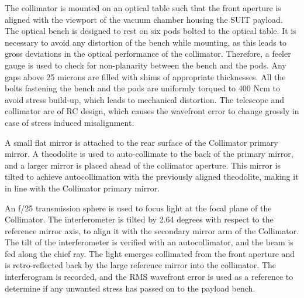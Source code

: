 \documentclass[12pt]{spieman}  %
\begin{document}
The collimator is mounted on an optical table such that the front aperture is aligned with the viewport of the vacuum chamber housing the SUIT payload. The optical bench is designed to rest on six pods bolted to the optical table. It is necessary to avoid any distortion of the bench while mounting, as this leads to gross deviations in the optical performance of the collimator. Therefore, a feeler gauge is used to check for non-planarity between the bench and the pods. Any gaps above 25 microns are filled with shims of appropriate thicknesses. All the bolts fastening the bench and the pods are uniformly torqued to 400 Ncm to avoid stress build-up, which leads to mechanical distortion. The telescope and collimator are of RC design, which causes the wavefront error to change grossly in case of stress induced misalignment.

A small flat mirror is attached to the rear surface of the Collimator primary mirror. A theodolite is used to auto-collimate to the back of the primary mirror, and a larger mirror is placed ahead of the collimator aperture. This mirror is tilted to achieve autocollimation with the previously aligned theodolite, making it in line with the Collimator primary mirror.

An f/25 transmission sphere is used to focus light at the focal plane of the Collimator. The interferometer is tilted by 2.64 degrees with respect to the reference mirror axis, to align it with the secondary mirror arm of the Collimator. The tilt of the interferometer is verified with an autocollimator, and the beam is fed along the chief ray. The light emerges collimated from the front aperture and is retro-reflected back by the large reference mirror into the collimator. The interferogram is recorded, and the RMS wavefront error is used as a reference to determine if any unwanted stress has passed on to the payload bench. 
\end{document}
